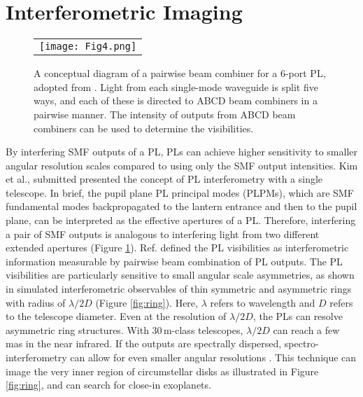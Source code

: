 \documentclass[]{AO4ELT}  %
\begin{document}
\section{Interferometric Imaging}\label{sec:imaging}


\begin{figure} [hbt!]
\begin{center}
\begin{tabular}{c} 
\texttt{[image: Fig4.png]}
\end{tabular}
\end{center}
\caption[example] 
{ \label{fig:interferometry} 
A conceptual diagram of a pairwise beam combiner for a 6-port PL, adopted from \cite{kim23spie}. Light from each single-mode waveguide is split five ways, and each of these is directed to ABCD beam combiners in a pairwise manner. The intensity of outputs from ABCD beam combiners can be used to determine the visibilities.}
\end{figure} 

By interfering SMF outputs of a PL, PLs can achieve higher sensitivity to smaller angular resolution scales compared to using only the SMF output intensities. Kim et al., submitted \cite{kim23} presented the concept of PL interferometry with a single telescope. In brief, the pupil plane PL principal modes (PLPMs), which are SMF fundamental modes backpropagated to the lantern entrance and then to the pupil plane, can be interpreted as the effective apertures of a PL. Therefore, interfering a pair of SMF outputs is analogous to interfering light from two different extended apertures (Figure \ref{fig:interferometry}). Ref. \cite{kim23} defined the PL visibilities as interferometric information measurable by pairwise beam combination of PL outputs. The PL visibilities are particularly sensitive to small angular scale asymmetries, as shown in simulated interferometric observables of thin symmetric and asymmetric rings with radius of $\lambda/2D$ (Figure \ref{fig:ring}). Here, $\lambda$ refers to wavelength and $D$ refers to the telescope diameter. Even at the resolution of $\lambda/2D$, the PLs can resolve asymmetric ring structures. With 30\,m-class telescopes, $\lambda/2D$ can reach a few mas in the near infrared. If the outputs are spectrally dispersed, spectro-interferometry can allow for even smaller angular resolutions \cite{des07}. This technique can image the very inner region of circumstellar disks as illustrated in Figure \ref{fig:ring}, and can search for close-in exoplanets. 
\end{document}

